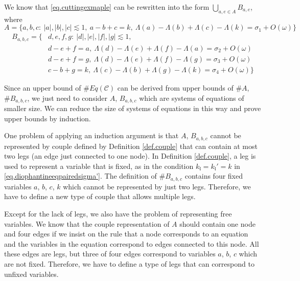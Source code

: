 We know that \eqref{eq.cuttingexmaple} can be rewritten into the form $\bigcup_{a,e\in A} B_{a,e}$, where
\begin{equation}\label{eq.couplequationA}
 A=\{a, b, c:\ |a|,|b|,|c|\lesssim 1,\ a - b + c = k,\ \Lambda(a) - \Lambda(b) + \Lambda(c) - \Lambda(k) =\sigma_{1} + O(\omega)\}
\end{equation}
\begin{equation}\label{eq.couplequationB}
 \begin{split}
 B_{a,b,c}=\{&d, e, f, g:\ |d|,|e|,|f|,|g|\lesssim 1,
 \\
 &d - e + f = a,\ \Lambda(d) - \Lambda(e) + \Lambda(f) - \Lambda(a) =\sigma_{2} + O(\omega)
 \\
 &d - e + f = g,\ \Lambda(d) - \Lambda(e) + \Lambda(f) - \Lambda(g) =\sigma_{3} + O(\omega)
 \\
 &c - b + g = k,\ \Lambda(c) - \Lambda(b) + \Lambda(g) - \Lambda(k) =\sigma_{4} + O(\omega)\}
 \end{split} 
\end{equation}

Since an upper bound of $\# Eq(\mathcal{C})$ can be derived from upper bounds of $\# A$, $\# B_{a,b,c}$, we just need to consider $A$, $B_{a,b,c}$ which are systems of equations of smaller size. We can reduce the size of systems of equations in this way and prove upper bounds by induction.

One problem of applying an induction argument is that $A$, $B_{a,b,c}$ cannot be represented by couple defined by Definition \ref{def.couple} that can contain at most two legs (an edge just connected to one node). In Definition \ref{def.couple}, a leg is used to represent a variable that is fixed, as in the condition $k_{\mathfrak{l}} = k_{\mathfrak{l}}'= k$ in \eqref{eq.diophantineeqpairedsigma'}. The definition of $\# B_{a,b,c}$ contains four fixed variables $a$, $b$, $c$, $k$ which cannot be represented by just two legs. Therefore, we have to define a new type of couple that allows multiple legs.

Except for the lack of legs, we also have the problem of representing free variables. We know that the couple representation of $A$ should contain one node and four edges if we insist on the rule that a node corresponds to an equation and the variables in the equation correspond to edges connected to this node. All these edges are legs, but three of four edges correspond to variables $a$, $b$, $c$ which are not fixed. Therefore, we have to define a type of legs that can correspond to unfixed variables.

